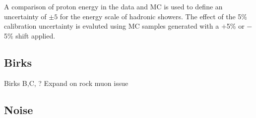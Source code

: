 A comparison of proton energy in the data and MC is
used to define an uncertainty of $\pm 5$  for the energy scale of
hadronic showers\cite{SusanProtondEdxCalib}. The effect of the 5\%
calibration uncertainty is evaluted using MC samples generated with a
$+$5\% or $-$5\% shift applied.



\subsection{Birks}\label{sec:birkssysts}
Birks B,C, ?
Expand on rock muon issue 



\subsection{Noise}\label{sec:noisesysts}




